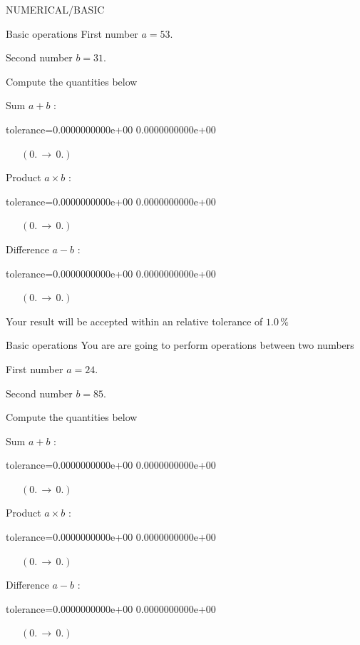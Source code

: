 \documentclass[12pt]{article}
\begin{document}
\begin{quiz}{NUMERICAL/BASIC}
\begin{cloze}{Basic operations}
First number $a = 53.\, $

Second number $b = 31.\, $

 

Compute the quantities below

Sum $ a + b $ : 
\begin{numerical}[points=1] 
\item[tolerance={0.0000000000e+00}] 0.0000000000e+00 
\end{numerical} 
 $\,$ 
 $ \quad (0. \, \rightarrow \, 0.) $ 

Product $ a \times b $ : 
\begin{numerical}[points=1] 
\item[tolerance={0.0000000000e+00}] 0.0000000000e+00 
\end{numerical} 
 $\,$ 
 $ \quad (0. \, \rightarrow \, 0.) $ 

Difference $ a - b $ : 
\begin{numerical}[points=1] 
\item[tolerance={0.0000000000e+00}] 0.0000000000e+00 
\end{numerical} 
 $\,$ 
 $ \quad (0. \, \rightarrow \, 0.) $ 

Your result will be accepted within an relative tolerance of $1.0\, \% $

\end{cloze} 


 \begin{cloze}{Basic operations} 
You are are going to perform operations between two numbers

First number $a = 24.\, $

Second number $b = 85.\, $

 

Compute the quantities below

Sum $ a + b $ : 
\begin{numerical}[points=1] 
\item[tolerance={0.0000000000e+00}] 0.0000000000e+00 
\end{numerical} 
 $\,$ 
 $ \quad (0. \, \rightarrow \, 0.) $ 

Product $ a \times b $ : 
\begin{numerical}[points=1] 
\item[tolerance={0.0000000000e+00}] 0.0000000000e+00 
\end{numerical} 
 $\,$ 
 $ \quad (0. \, \rightarrow \, 0.) $ 

Difference $ a - b $ : 
\begin{numerical}[points=1] 
\item[tolerance={0.0000000000e+00}] 0.0000000000e+00 
\end{numerical} 
 $\,$ 
 $ \quad (0. \, \rightarrow \, 0.) $ 


\end{cloze}
\end{quiz}
\end{document}
